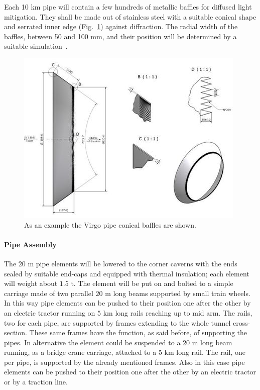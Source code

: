 Each 10 km pipe will contain a few hundreds of metallic baffles for diffused light mitigation. They shall be made out of stainless steel with a suitable conical shape and serrated inner edge (Fig.~\ref{fig:vac5}) against diffraction. The radial width of the baffles, between 50 and 100 mm, and their position will be determined by a suitable simulation~\cite{vinet97,vinet96}.

\begin{figure}
\begin{center}
\includegraphics{Sec_SiteInfra/Figures/VAC5.jpg}
\caption{As an example the Virgo pipe conical baffles are shown.}
\label{fig:vac5}
\end{center}
\end{figure}


\paragraph{Pipe Assembly}

The $20$ m pipe elements will be lowered to the corner caverns with the ends sealed by suitable end-caps and equipped with thermal insulation; each element will weight about $1.5$ t. The element will be put on and bolted to a simple carriage made of two parallel $20$ m long beams supported by small train wheels. In this way pipe elements can be pushed to their position one after the other by an electric tractor running on $5$ km long rails reaching up to mid arm. The rails, two for each pipe, are supported by frames extending to the whole tunnel cross-section. These same frames have the function, as said before, of supporting the pipes.
In alternative the element could be suspended to a $20$ m long beam running, as a bridge crane carriage, attached to a $5$ km long rail. The rail, one per pipe, is supported by the already mentioned frames. Also in this case pipe elements can be pushed to their position one after the other by an electric tractor or by a traction line.

